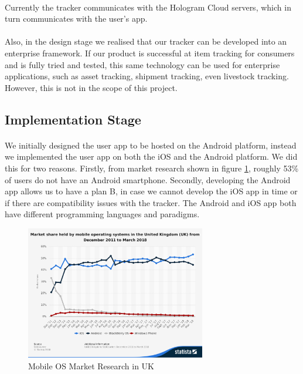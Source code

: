 \documentclass[12pt,a4paper]{article}
\begin{document}
        \paragraph{} Currently the tracker communicates with the Hologram Cloud servers, which in turn communicates with the user’s app.
        
        \paragraph{} Also, in the design stage we realised that our tracker can be developed into an enterprise framework. If our product is successful at item tracking for consumers and is fully tried and tested, this same technology can be used for enterprise applications, such as asset tracking, shipment tracking, even livestock tracking. However, this is not in the scope of this project. 
        
      \subsection{Implementation Stage}

        \paragraph{} We initially designed the user app to be hosted on the Android platform, instead we implemented the user app on both the iOS and the Android platform. We did this for two reasons. Firstly, from market research shown in figure \ref{fig:Mobile OS Market Research in UK}, roughly 53\% of users do not have an Android smartphone. Secondly, developing the Android app allows us to have a plan B, in case we cannot develop the iOS app in time or if there are compatibility issues with the tracker. The Android and iOS app both have different programming languages and paradigms. 

        \begin{figure}[H]
          \centering
          \includegraphics[width=0.7\textwidth]{../assets/design-implement-stage-market-research.png}
          \caption{Mobile OS Market Research in UK \cite{MobileOSMarketShare}}
          \label{fig:Mobile OS Market Research in UK}
        \end{figure}
        
\end{document}
